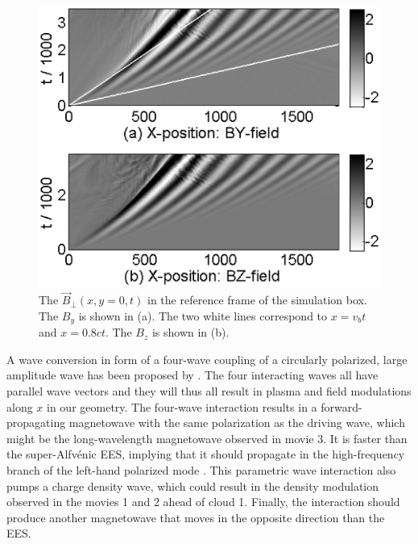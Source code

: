 \documentclass[structabstract]{aa}
\begin{document}
\begin{figure}
\centering
\includegraphics[width=\columnwidth]{Fig12.eps}
\caption{The $\vec{B}_\perp (x,y=0,t)$ in the reference frame of the
simulation box. The $B_y$ is shown in (a). The two white lines correspond 
to $x = v_b t$ and $x=0.8 ct$. The $B_z$ is shown in (b).}\label{Fig12}
\end{figure}

A wave conversion in form of a four-wave coupling of a circularly polarized, 
large amplitude wave has been proposed by \citet{Instability}. The four 
interacting waves all have parallel wave vectors and they will thus all 
result in plasma and field modulations along $x$ in our geometry. The 
four-wave interaction results in a forward-propagating magnetowave with
the same polarization as the driving wave, which might be the long-wavelength 
magnetowave observed in movie 3. It is faster than the super-Alfv\'enic EES,
implying that it should propagate in the high-frequency branch of the 
left-hand polarized mode \citep{Treumann}. This parametric wave interaction 
also pumps a charge density wave, which could result in the density modulation 
observed in the movies 1 and 2 ahead of cloud 1. Finally, the interaction 
should produce another magnetowave that moves in the opposite direction than 
the EES.
\end{document}
